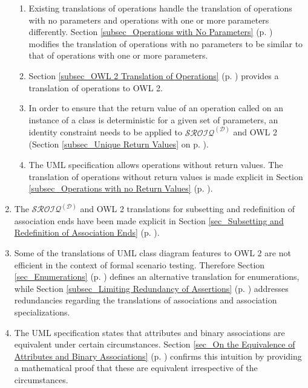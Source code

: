 \begin{enumerate}
\begin{enumerate}
 \item Existing translations of operations handle the translation of operations with no parameters and operations with one or more parameters differently. 
 Section \ref{subsec_Operations with No Parameters} (p. \pageref{subsec_Operations with No Parameters}) modifies the translation of operations with no parameters to be similar to that of
 operations with one or more parameters.
 \item Section \ref{subsec_OWL 2 Translation of Operations} (p. \pageref{subsec_OWL 2 Translation of Operations}) provides a translation of operations to OWL 2.
 \item In order to ensure that the return value of an operation called on an instance of a class is deterministic for a given set of parameters, an identity constraint needs to be 
 applied to $\mathcal{SROIQ}^{(\mathcal{D})}$ and OWL 2 (Section \ref{subsec_Unique Return Values} on p. \pageref{subsec_Unique Return Values}). 
 \item The UML specification allows operations without return values. The translation of operations 
 without return values is made explicit in Section \ref{subsec_Operations with no Return Values} 
 (p. \pageref{subsec_Operations with no Return Values}).
 \end{enumerate}
 \item The $\mathcal{SROIQ^{(\mathcal{D})}}$ and OWL 2 translations for subsetting and redefinition of association ends have been made explicit in Section \ref{sec_Subsetting and Redefinition of Association Ends}
 (p. \pageref{sec_Subsetting and Redefinition of Association Ends}).
 \item Some of the translations of UML class diagram features to OWL 2 are not efficient in the context of formal scenario testing. Therefore Section \ref{sec_Enumerations} 
 (p. \pageref{sec_Enumerations}) defines an alternative translation for enumerations, while Section \ref{subsec_Limiting Redundancy of Assertions} (p. \pageref{subsec_Limiting Redundancy of Assertions})
 addresses redundancies regarding the translations of associations and association specializations.
 \item The UML specification states that attributes and binary associations are equivalent under certain circumstances. 
 Section \ref{sec_On the Equivalence of Attributes and Binary Associations}
 (p. \pageref{sec_On the Equivalence of Attributes and Binary Associations}) confirms this intuition by providing a mathematical proof 
 that these are equivalent irrespective of the circumstances.

\end{enumerate}
